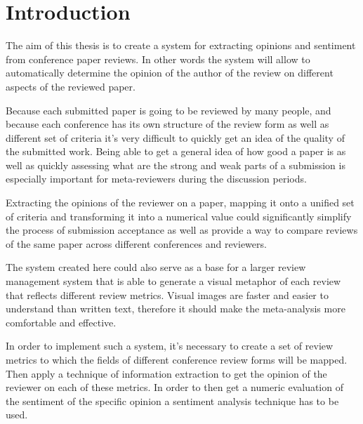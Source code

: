 \chapter*{Introduction}

The aim of this thesis is to create a system for extracting opinions and sentiment from conference paper reviews. In other words the system will allow to automatically determine the opinion of the author of the review on different aspects of the reviewed paper. 

Because each submitted paper is going to be reviewed by many people, and because each conference has its own structure of the review form as well as different set of criteria it’s very difficult to quickly get an idea of the quality of the submitted work. Being able to get a general idea of how good a paper is as well as quickly assessing what are the strong and weak parts of a submission is especially important for meta-reviewers during the discussion periods.

Extracting the opinions of the reviewer on a paper, mapping it onto a unified set of criteria and transforming it into a numerical value could significantly simplify the process of submission acceptance as well as provide a way to compare reviews of the same paper across different conferences and reviewers.

The system created here could also serve as a base for a larger review management system that is able to generate a visual metaphor of each  review that reflects different review metrics. Visual images are faster and easier to understand than written text, therefore it should make the meta-analysis more comfortable and effective.

In order to implement such a system, it’s necessary to create a set of review metrics to which the fields of different conference review forms will be mapped. Then apply a technique of information extraction to get the opinion of the reviewer on each of these metrics. In order to then get a numeric  evaluation of the sentiment of the specific opinion a sentiment analysis technique has to be used. 
